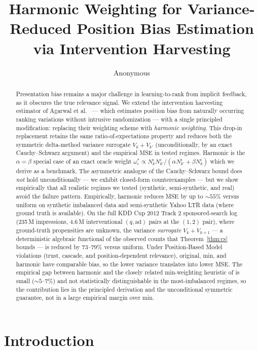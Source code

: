 \documentclass[sigconf]{acmart}
\title{Harmonic Weighting for Variance-Reduced Position Bias Estimation via Intervention Harvesting}
\author{Anonymous}
\affiliation{%
  \institution{Anonymous}
  \country{}}
\begin{document}
\begin{abstract}
Presentation bias remains a major challenge in learning-to-rank from implicit feedback,
as it obscures the true relevance signal. We extend the intervention harvesting estimator
of Agarwal et al.~\cite{agarwal2019estimating} --- which estimates position bias from
naturally occurring ranking variations without intrusive randomization --- with a single
principled modification: replacing their weighting scheme with \emph{harmonic weighting}.
This drop-in replacement retains the same ratio-of-expectations property and reduces both
the symmetric delta-method variance surrogate $V_k+V_{k'}$ (unconditionally, by an exact
Cauchy--Schwarz argument) and the empirical MSE in tested regimes. Harmonic is the
$\alpha = \beta$ special case of an exact oracle weight $\omega_i^* \propto N_k^i N_{k'}^i /
(\alpha N_{k'}^i + \beta N_k^i)$ which we derive as a benchmark. The asymmetric analogue of
the Cauchy--Schwarz bound does \emph{not} hold unconditionally --- we exhibit closed-form
counterexamples --- but we show empirically that all realistic regimes we tested (synthetic,
semi-synthetic, and real) avoid the failure pattern. Empirically, harmonic reduces MSE by up to $\sim 55\%$ versus uniform on synthetic
imbalanced data and semi-synthetic Yahoo LTR data (where ground truth is available).
On the full KDD Cup 2012 Track 2 sponsored-search log (235\,M impressions, 4.6\,M
interventional $(q,\mathrm{ad})$ pairs at the $(1,2)$ pair), where ground-truth
propensities are unknown, the variance \emph{surrogate} $V_k+V_{k+1}$ --- a
deterministic algebraic functional of the observed counts that
Theorem~\ref{thm:cs} bounds --- is reduced by $73$--$79\%$ versus uniform. Under Position-Based Model
violations (trust, cascade, and position-dependent relevance), original, min, and harmonic
have comparable bias, so the lower variance translates into lower MSE. The empirical gap
between harmonic and the closely related min-weighting heuristic of \cite{agarwal2019estimating}
is small ($\sim 5$--$7\%$) and not statistically distinguishable in the most-imbalanced
regimes, so the contribution lies in the principled derivation and the unconditional
symmetric guarantee, not in a large empirical margin over min.
\end{abstract}

\maketitle

\section{Introduction}
\label{sec:introduction}
\end{document}
